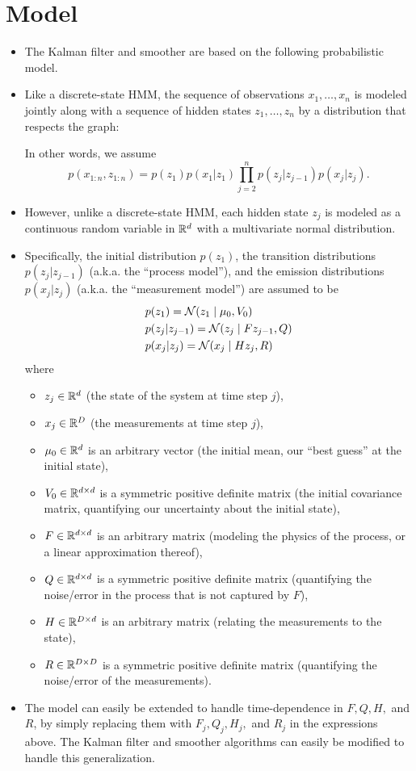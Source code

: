 \documentclass[12pt]{article}
\begin{document}
\section{Model}

\begin{itemize}
\item The Kalman filter and smoother are based on the following probabilistic model.
\item Like a discrete-state HMM, the sequence of observations $x_1,\ldots,x_n$ is modeled jointly along with a sequence of hidden states $z_1,\ldots,z_n$ by a distribution that respects the graph:

In other words, we assume
$$ p(x_{1:n},z_{1:n}) = p(z_1) p(x_1 | z_1) \prod_{j = 2}^n p(z_j | z_{j -1}) p(x_j | z_j). $$
\item However, unlike a discrete-state HMM, each hidden state $z_j$ is modeled as a continuous random variable in $\mathbb{R}^d$ with a multivariate normal distribution. 
\item Specifically, the initial distribution $p(z_1)$, the transition distributions $p(z_j | z_{j-1})$ (a.k.a. the ``process model''), and the emission distributions $p(x_j | z_j)$ (a.k.a. the ``measurement model'') are assumed to be
\begin{align*}
& p(z_1) = \mathcal{N}(z_1 \mid \mu_0,V_0)\\
& p(z_j | z_{j-1}) = \mathcal{N}(z_j \mid F z_{j-1},Q)\\
& p(x_j | z_j) = \mathcal{N}(x_j \mid H z_j,R)
\end{align*}
where
\begin{itemize}
\item $z_j \in \mathbb{R}^d$ (the state of the system at time step $j$),
\item $x_j \in \mathbb{R}^D$ (the measurements at time step $j$),
\item $\mu_0 \in \mathbb{R}^d$ is an arbitrary vector (the initial mean, our ``best guess'' at the initial state),
\item $V_0 \in \mathbb{R}^{d \times d}$ is a symmetric positive definite matrix (the initial covariance matrix, quantifying our uncertainty about the initial state),
\item $F \in \mathbb{R}^{d \times d}$ is an arbitrary matrix (modeling the physics of the process, or a linear approximation thereof),
\item $Q \in \mathbb{R}^{d \times d}$ is a symmetric positive definite matrix (quantifying the noise/error in the process that is not captured by $F$),
\item $H \in \mathbb{R}^{D \times d}$ is an arbitrary matrix (relating the measurements to the state),
\item $R \in \mathbb{R}^{D \times D}$ is a symmetric positive definite matrix (quantifying the noise/error of the measurements).
\end{itemize}
\item The model can easily be extended to handle time-dependence in $F,Q,H,$ and $R$, by simply replacing them with $F_j,Q_j,H_j,$ and $R_j$ in the expressions above. The Kalman filter and smoother algorithms can easily be modified to handle this generalization.
\end{itemize}
\end{document}
